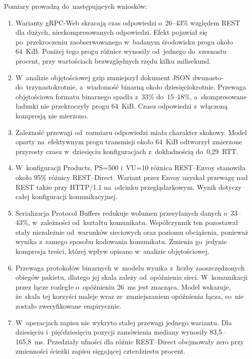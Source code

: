 Pomiary prowadzą do~następujących wniosków:

\begin{enumerate}
\item Warianty gRPC-Web skracają czas odpowiedzi o~26--43\% względem REST dla dużych, nieskompresowanych odpowiedzi. Efekt pojawiał się po~przekroczeniu zaobserwowanego w~badanym środowisku progu około 64~KiB. Poniżej tego progu różnice wynosiły od~jednego do~szesnastu procent, przy wartościach bezwzględnych rzędu kilku milisekund.

\item W~analizie objętościowej gzip zmniejszył dokument JSON dwunasto- do~trzynastokrotnie, a~wiadomość binarną około dziesięciokrotnie. Przewaga objętościowa formatu binarnego spadła z~33\% do~15--18\%, a~skompresowane ładunki nie przekroczyły progu 64~KiB. Czasu odpowiedzi z~włączoną kompresją nie mierzono.

\item Zależność przewagi od~rozmiaru odpowiedzi miała charakter skokowy. Model oparty na~efektywnym progu transmisji około 64~KiB odtworzył zmierzone przyrosty czasu w~dziesięciu konfiguracjach z~dokładnością do~0,29~RTT.

\item W~konfiguracji Products, PS=500 i~VU=10 różnica REST--Envoy stanowiła około 95\% różnicy REST--Direct. Wariant przez Envoy uzyskał przewagę nad REST także przy HTTP/1.1 na~odcinku przeglądarkowym. Wynik dotyczy całej konfiguracji komunikacyjnej.

\item Serializacja Protocol Buffers redukuje wolumen przesyłanych danych o~33--43\%, w~zależności od~kształtu komunikatu. Współczynnik ten pozostawał stały niezależnie od~warunków sieciowych oraz poziomu obciążenia, ponieważ wynika z~samego sposobu kodowania komunikatu. Zmienia go~jedynie kompresja treści, której wpływ opisano w~analizie objętościowej.

\item Przewaga protokołów binarnych w~modelu wynika z~liczby zaoszczędzonych obiegów pakietu, dlatego jej skala zależy od~opóźnienia sieci. W~komunikacji przez łącze rozległe o~opóźnieniu 26~ms jest znacząca. Model wskazuje, że~skala tej korzyści maleje wraz ze~zmniejszaniem opóźnienia łącza, co~nie zostało zweryfikowane empirycznie.

\item W~operacjach zapisu nie wykryto stałej przewagi jednego wariantu. Dla dziesięciu i~pięćdziesięciu pozycji zamówienia mediany wynosiły 83,5--165,8~ms. Przedziały ufności dla różnic REST--Direct obejmowały zero przy zmienności ścieżki zapisu sięgającej czterdziestu procent.


\end{enumerate}

